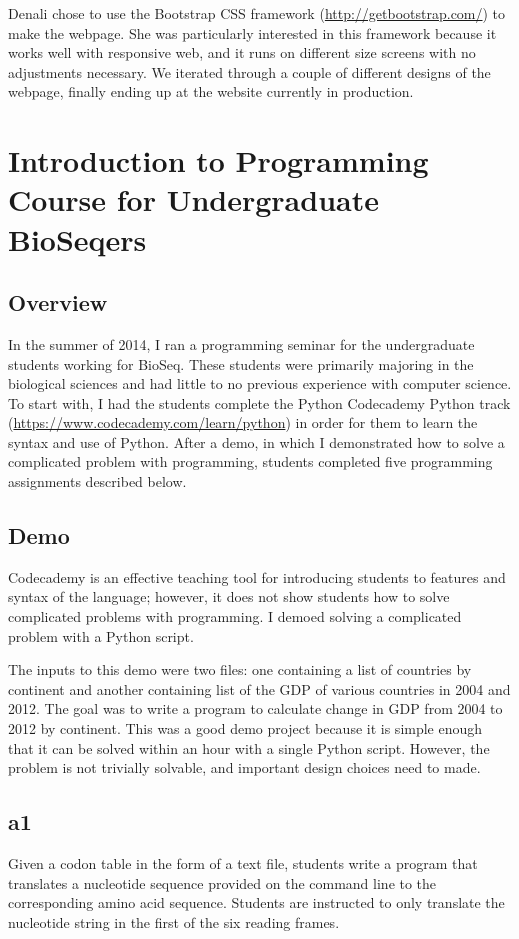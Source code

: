 \documentclass{report}
\begin{document}
Denali chose to use the Bootstrap CSS framework (\url{http://getbootstrap.com/}) to make the webpage. She was particularly interested in this framework because it works well with responsive web, and it runs on different size screens with no adjustments necessary. We iterated through a couple of different designs of the webpage, finally ending up at the website currently in production.

\section{Introduction to Programming Course for Undergraduate BioSeqers}
\subsection{Overview}
In the summer of 2014, I ran a programming seminar for the undergraduate students working for BioSeq. These students were primarily majoring in the biological sciences and had little to no previous experience with computer science. To start with, I had the students complete the Python Codecademy Python track (\url{https://www.codecademy.com/learn/python}) in order for them to learn the syntax and use of Python. After a demo, in which I demonstrated how to solve a complicated problem with programming, students completed five programming assignments described below.

\subsection{Demo}
Codecademy is an effective teaching tool for introducing students to features and syntax of the language; however, it does not show students how to solve complicated problems with programming. I demoed solving a complicated problem with a Python script.

The inputs to this demo were two files: one containing a list of countries by continent and another containing list of the GDP of various countries in 2004 and 2012. The goal was to write a program to calculate change in GDP from 2004 to 2012 by continent. This was a good demo project because it is simple enough that it can be solved within an hour with a single Python script. However, the problem is not trivially solvable, and important design choices need to made.

\subsection{a1}
Given a codon table in the form of a text file, students write a program that translates a nucleotide sequence provided on the command line to the corresponding amino acid sequence. Students are instructed to only translate the nucleotide string in the first of the six reading frames.
\end{document}
